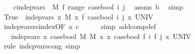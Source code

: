 \begin{isabellebody}
\ \ \isamarkupfalse%
\ c{\isacharcolon}{\kern0pt}{\isachardoublequoteopen}indep{\isacharunderscore}{\kern0pt}vars\ {\isacharparenleft}{\kern0pt}{\isasymlambda}{\isacharunderscore}{\kern0pt}{\isachardot}{\kern0pt}\ M{\isacharprime}{\kern0pt}{\isacharparenright}{\kern0pt}\ f\ {\isacharparenleft}{\kern0pt}range\ {\isacharparenleft}{\kern0pt}case{\isacharunderscore}{\kern0pt}bool\ i\ j{\isacharparenright}{\kern0pt}{\isacharparenright}{\kern0pt}{\isachardoublequoteclose}\ \isamarkupfalse%
\ assms{\isacharparenleft}{\kern0pt}{}{\isacharparenright}{\kern0pt}\ b\ \isamarkupfalse%
\ simp\isanewline
\isanewline
\ \ \isamarkupfalse%
\ {\isachardoublequoteopen}True\ {\isacharequal}{\kern0pt}\ indep{\isacharunderscore}{\kern0pt}vars\ {\isacharparenleft}{\kern0pt}{\isasymlambda}x{\isachardot}{\kern0pt}\ M{\isacharprime}{\kern0pt}{\isacharparenright}{\kern0pt}\ {\isacharparenleft}{\kern0pt}{\isasymlambda}x{\isachardot}{\kern0pt}\ f\ {\isacharparenleft}{\kern0pt}case{\isacharunderscore}{\kern0pt}bool\ i\ j\ x{\isacharparenright}{\kern0pt}{\isacharparenright}{\kern0pt}\ UNIV{\isachardoublequoteclose}\ \isanewline
\ \ \ \ \isamarkupfalse%
\ indep{\isacharunderscore}{\kern0pt}vars{\isacharunderscore}{\kern0pt}reindex{\isacharbrackleft}{\kern0pt}OF\ a\ c{\isacharbrackright}{\kern0pt}\isanewline
\ \ \ \ \isamarkupfalse%
\ {\isacharparenleft}{\kern0pt}simp\ add{\isacharcolon}{\kern0pt}comp{\isacharunderscore}{\kern0pt}def{\isacharparenright}{\kern0pt}\isanewline
\ \ \isamarkupfalse%
\ \isamarkupfalse%
\ {\isachardoublequoteopen}{\isachardot}{\kern0pt}{\isachardot}{\kern0pt}{\isachardot}{\kern0pt}\ {\isacharequal}{\kern0pt}\ indep{\isacharunderscore}{\kern0pt}vars\ {\isacharparenleft}{\kern0pt}{\isasymlambda}x{\isachardot}{\kern0pt}\ case{\isacharunderscore}{\kern0pt}bool\ M{\isacharprime}{\kern0pt}\ M{\isacharprime}{\kern0pt}\ x{\isacharparenright}{\kern0pt}\ {\isacharparenleft}{\kern0pt}{\isasymlambda}x{\isachardot}{\kern0pt}\ case{\isacharunderscore}{\kern0pt}bool\ {\isacharparenleft}{\kern0pt}f\ i{\isacharparenright}{\kern0pt}\ {\isacharparenleft}{\kern0pt}f\ j{\isacharparenright}{\kern0pt}\ x{\isacharparenright}{\kern0pt}\ UNIV{\isachardoublequoteclose}\isanewline
\ \ \ \ \isamarkupfalse%
\ {\isacharparenleft}{\kern0pt}rule\ indep{\isacharunderscore}{\kern0pt}vars{\isacharunderscore}{\kern0pt}cong{\isacharcomma}{\kern0pt}\ simp{\isacharparenright}{\kern0pt}\isanewline
\ \ \ \ \isamarkupfalse%

\end{isabellebody}
